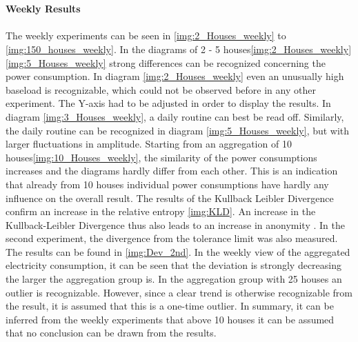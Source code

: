 \\
\\
\textbf{Weekly Results}
\\
\\
The weekly experiments can be seen in \ref{img:2_Houses_weekly} to \ref{img:150_houses_weekly}. In the diagrams of 2 - 5 houses\ref{img:2_Houses_weekly}\ref{img:5_Houses_weekly} strong differences can be recognized concerning the power consumption.
In diagram \ref{img:2_Houses_weekly} even an unusually high baseload is recognizable, which could not be observed before in any other experiment. The Y-axis had to be adjusted in order to display the results. In diagram \ref{img:3_Houses_weekly}, a daily routine can best be read off. Similarly, the daily routine can be recognized in diagram \ref{img:5_Houses_weekly}, but with larger fluctuations in amplitude. Starting from an aggregation of 10 houses\ref{img:10_Houses_weekly}, the similarity of the power consumptions increases and the diagrams hardly differ from each other. This is an indication that already from 10 houses individual power consumptions have hardly any influence on the overall result. The results of the Kullback Leibler Divergence confirm an increase in the relative entropy \ref{img:KLD}. An increase in the Kullback-Leibler Divergence thus also leads to an increase in anonymity \cite{kalogridis2010privacy}.
In the second experiment, the divergence from the tolerance limit was also measured. The results can be found in \ref{img:Dev_2nd}. In the weekly view of the aggregated electricity consumption, it can be seen that the deviation is strongly decreasing the larger the aggregation group is. In the aggregation group with 25 houses an outlier is recognizable. However, since a clear trend is otherwise recognizable from the result, it is assumed that this is a one-time outlier. In summary, it can be inferred from the weekly experiments that above 10 houses it can be assumed that no conclusion can be drawn from the results.

